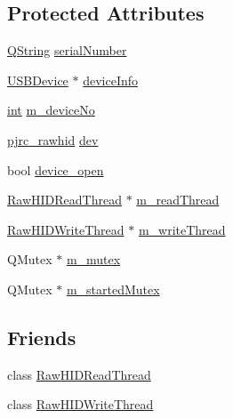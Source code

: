 \subsection*{Protected Attributes}
\begin{DoxyCompactItemize}
\item 
\hyperlink{group___u_a_v_objects_plugin_gab9d252f49c333c94a72f97ce3105a32d}{Q\-String} \hyperlink{group___raw_h_i_d_plugin_ga0b5d9bd4ac69612199afa5b59dfc3ed6}{serial\-Number}
\item 
\hyperlink{class_u_s_b_device}{U\-S\-B\-Device} $\ast$ \hyperlink{group___raw_h_i_d_plugin_gab9b0f096459d4bc5a220ac42e9465752}{device\-Info}
\item 
\hyperlink{ioapi_8h_a787fa3cf048117ba7123753c1e74fcd6}{int} \hyperlink{group___raw_h_i_d_plugin_ga0dde2d900a5f9cbd059e528de3f0c73b}{m\-\_\-device\-No}
\item 
\hyperlink{classpjrc__rawhid}{pjrc\-\_\-rawhid} \hyperlink{group___raw_h_i_d_plugin_ga4939588bf5bf31e39139a75ca4319884}{dev}
\item 
bool \hyperlink{group___raw_h_i_d_plugin_ga6ec3ad7c063679816e5aafed60f677c3}{device\-\_\-open}
\item 
\hyperlink{class_raw_h_i_d_read_thread}{Raw\-H\-I\-D\-Read\-Thread} $\ast$ \hyperlink{group___raw_h_i_d_plugin_gaecb703f979aac429ee3961f52c998b53}{m\-\_\-read\-Thread}
\item 
\hyperlink{class_raw_h_i_d_write_thread}{Raw\-H\-I\-D\-Write\-Thread} $\ast$ \hyperlink{group___raw_h_i_d_plugin_ga103f382a48fee4b9fe034b3d88f45d42}{m\-\_\-write\-Thread}
\item 
Q\-Mutex $\ast$ \hyperlink{group___raw_h_i_d_plugin_ga915d676c812135bc006e37a140a52365}{m\-\_\-mutex}
\item 
Q\-Mutex $\ast$ \hyperlink{group___raw_h_i_d_plugin_ga62ee841aa1de86d73cfd1b9bc7a5d719}{m\-\_\-started\-Mutex}
\end{DoxyCompactItemize}
\subsection*{Friends}
\begin{DoxyCompactItemize}
\item 
class \hyperlink{group___raw_h_i_d_plugin_ga8ff6a2bdea09543bed5912710ec13dab}{Raw\-H\-I\-D\-Read\-Thread}
\item 
class \hyperlink{group___raw_h_i_d_plugin_ga2d3d87c46461ab8d3746b207989bb7f8}{Raw\-H\-I\-D\-Write\-Thread}
\end{DoxyCompactItemize}


